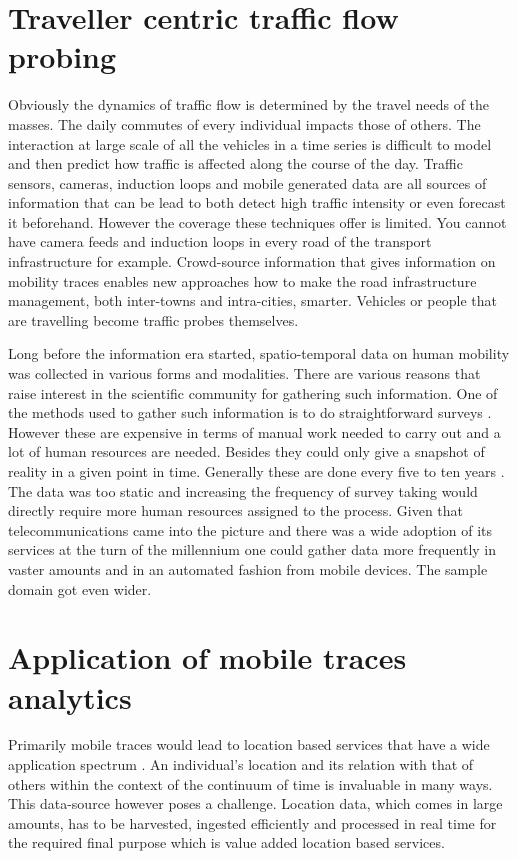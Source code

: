 \documentclass[12pt, a4paper]{report}
\theoremstyle{definition}
\theoremstyle{definition}%
\theoremstyle{definition}%
\theoremstyle{definition}%
\theoremstyle{definition}%
\theoremstyle{definition}%
\begin{document}
\section{Traveller centric traffic flow probing}

Obviously the dynamics of traffic flow is determined by the travel needs of the masses. The daily commutes of every individual impacts those of others. The interaction at large scale of all the vehicles in a time series is difficult to model and then predict how traffic is affected along the course of the day. Traffic sensors, cameras, induction loops and mobile generated data are all sources of information that can be lead to both detect high traffic intensity or even forecast it beforehand.  However the coverage these techniques offer is limited. You cannot have camera feeds and induction loops in every road of the transport infrastructure for example. Crowd-source information that gives information on mobility traces enables new approaches how to make the road infrastructure management, both inter-towns and intra-cities, smarter. Vehicles or people that are travelling become traffic probes themselves.

Long before the information era started, spatio-temporal data on human mobility was collected in various forms and modalities. There are various reasons that raise interest in the scientific community for gathering such information. One of the methods used to gather such information is to do straightforward surveys\cite{Calabrese2013} \cite{Colak2015}. However these are expensive in terms of manual work needed to carry out and a lot of human resources are needed. Besides they could only give a snapshot of reality in a given point in time.  Generally these are done every five to ten years \cite{Toole2015}. The data was too static and increasing the frequency of survey taking would directly require more human resources assigned to the process. Given that telecommunications came into the picture and there was a wide adoption of its services at the turn of the millennium one could gather data more frequently in vaster amounts and in an automated fashion from mobile devices. The sample domain got even wider.

\section{Application of mobile traces analytics}

Primarily mobile traces would lead to location based services that have a wide application spectrum \cite{Hoteit2014,Calabrese2013,Gonzalez2008,Hoteit2016}. An individual's location and its relation with that of others within the context of the continuum of time is invaluable in many ways. This data-source however poses a challenge. Location data, which comes in large amounts, has to be harvested, ingested efficiently and processed in real time for the required final purpose which is value added location based services.
\end{document}
